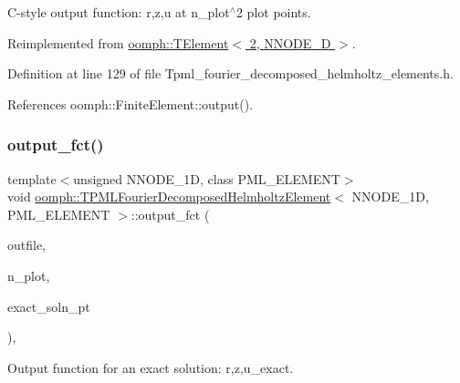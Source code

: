 C-\/style output function\+: r,z,u at n\+\_\+plot$^\wedge$2 plot points. 



Reimplemented from \hyperlink{classoomph_1_1TElement_3_012_00_01NNODE__1D_01_4_a9c5e3dba68906cb65e1f38eb0638080c}{oomph\+::\+T\+Element$<$ 2, N\+N\+O\+D\+E\+\_\+D $>$}.



Definition at line 129 of file Tpml\+\_\+fourier\+\_\+decomposed\+\_\+helmholtz\+\_\+elements.\+h.



References oomph\+::\+Finite\+Element\+::output().

\mbox{\label{classoomph_1_1TPMLFourierDecomposedHelmholtzElement_a8d10df8873643287fa87842e34e3b898}} 
\subsubsection{\texorpdfstring{output\+\_\+fct()}{output\_fct()}\hspace{0.1cm}{\footnotesize\ttfamily [1/2]}}
{\footnotesize\ttfamily template$<$unsigned N\+N\+O\+D\+E\+\_\+1D, class P\+M\+L\+\_\+\+E\+L\+E\+M\+E\+NT$>$ \\
void \hyperlink{classoomph_1_1TPMLFourierDecomposedHelmholtzElement}{oomph\+::\+T\+P\+M\+L\+Fourier\+Decomposed\+Helmholtz\+Element}$<$ N\+N\+O\+D\+E\+\_\+1D, P\+M\+L\+\_\+\+E\+L\+E\+M\+E\+NT $>$\+::output\+\_\+fct (\begin{DoxyParamCaption}\item[{std\+::ostream \&}]{outfile,  }\item[{const unsigned \&}]{n\+\_\+plot,  }\item[{\hyperlink{classoomph_1_1FiniteElement_a690fd33af26cc3e84f39bba6d5a85202}{Finite\+Element\+::\+Steady\+Exact\+Solution\+Fct\+Pt}}]{exact\+\_\+soln\+\_\+pt }\end{DoxyParamCaption})\hspace{0.3cm}{\ttfamily [inline]}, {\ttfamily [virtual]}}



Output function for an exact solution\+: r,z,u\+\_\+exact. 



